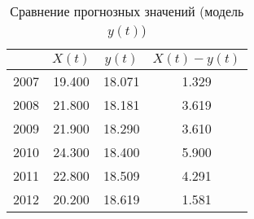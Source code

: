 \begin{table}[ht]
\centering
\caption{Сравнение прогнозных значений (модель $ y(t) $)} 
\label{table:prediction_trend}
\begin{tabular}{r|ccc}
  \hline
 & $X(t)$ & $y(t)$ & $ X(t) - y(t) $ \\ 
  \hline
2007 & 19.400 & 18.071 & 1.329 \\ 
  2008 & 21.800 & 18.181 & 3.619 \\ 
  2009 & 21.900 & 18.290 & 3.610 \\ 
  2010 & 24.300 & 18.400 & 5.900 \\ 
  2011 & 22.800 & 18.509 & 4.291 \\ 
  2012 & 20.200 & 18.619 & 1.581 \\ 
   \hline
\end{tabular}
\end{table}
